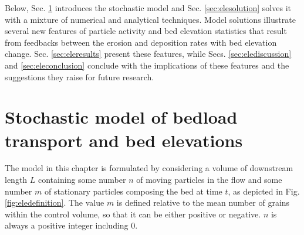 Below, Sec. \ref{sec:elemodel} introduces the stochastic model and Sec. \ref{sec:elesolution} solves it with a mixture of numerical and analytical techniques. Model solutions illustrate several new features of particle activity and bed elevation statistics that result from feedbacks between the erosion and deposition rates with bed elevation change. Sec. \ref{sec:eleresults} present these features, while Secs. \ref{sec:elediscussion} and \ref{sec:eleconclusion} conclude with the implications of these features and the suggestions they raise for future research.

\section{Stochastic model of bedload transport and bed elevations}
\label{sec:elemodel}

The model in this chapter is formulated by considering a volume of downstream length $L$ containing some number $n$ of moving particles in the flow and some number $m$ of stationary particles composing the bed at time $t$, as depicted in Fig. \ref{fig:eledefinition}. The value $m$ is defined relative to the mean number of grains within the control volume, so that it can be either positive or negative. $n$ is always a positive integer including $0$.


